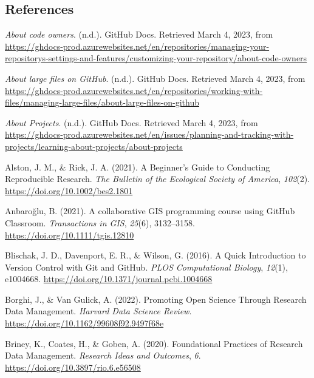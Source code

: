 \hypertarget{references}{%
\subsection{References}\label{references}}

\hypertarget{refs}{}
\begin{CSLReferences}{1}{0}
\leavevmode{}%
\emph{About code owners}. (n.d.). GitHub Docs. Retrieved March 4, 2023, from \url{https://ghdocs-prod.azurewebsites.net/en/repositories/managing-your-repositorys-settings-and-features/customizing-your-repository/about-code-owners}

\leavevmode{}%
\emph{About large files on GitHub}. (n.d.). GitHub Docs. Retrieved March 4, 2023, from \url{https://ghdocs-prod.azurewebsites.net/en/repositories/working-with-files/managing-large-files/about-large-files-on-github}

\leavevmode{}%
\emph{About Projects}. (n.d.). GitHub Docs. Retrieved March 4, 2023, from \url{https://ghdocs-prod.azurewebsites.net/en/issues/planning-and-tracking-with-projects/learning-about-projects/about-projects}

\leavevmode{}%
Alston, J. M., \& Rick, J. A. (2021). A Beginner's Guide to Conducting Reproducible Research. \emph{The Bulletin of the Ecological Society of America}, \emph{102}(2). \url{https://doi.org/10.1002/bes2.1801}

\leavevmode{}%
Anbaroğlu, B. (2021). A collaborative GIS programming course using GitHub Classroom. \emph{Transactions in GIS}, \emph{25}(6), 3132--3158. \url{https://doi.org/10.1111/tgis.12810}

\leavevmode{}%
Blischak, J. D., Davenport, E. R., \& Wilson, G. (2016). A Quick Introduction to Version Control with Git and GitHub. \emph{PLOS Computational Biology}, \emph{12}(1), e1004668. \url{https://doi.org/10.1371/journal.pcbi.1004668}

\leavevmode{}%
Borghi, J., \& Van Gulick, A. (2022). Promoting Open Science Through Research Data Management. \emph{Harvard Data Science Review}. \url{https://doi.org/10.1162/99608f92.9497f68e}

\leavevmode{}%
Briney, K., Coates, H., \& Goben, A. (2020). Foundational Practices of Research Data Management. \emph{Research Ideas and Outcomes}, \emph{6}. \url{https://doi.org/10.3897/rio.6.e56508}


\end{CSLReferences}
